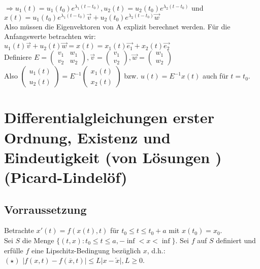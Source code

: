 \documentclass[12pt,a4paper]{article}
\newcommand{\DGLs}{Differentialgleichungen }
\newcommand{\LSG}{Lösungen }
\begin{document}
$\Rightarrow u_1(t) = u_1(t_0) e^{\lambda_1(t-t_0)}, u_2(t) = u_2(t_0) e^{\lambda_2(t-t_0)}$ und $x(t) = u_1(t_0) e^{\lambda_1(t-t_0)} \overset{\rightarrow}{v} + u_2(t_0)e^{\lambda_2(t-t_0)}\overset{\rightarrow}{w}$ \\
Also müssen die Eigenvektoren von A explizit berechnet werden. Für die Anfangswerte betrachten wir: \\
$u_1(t)\overset{\rightarrow}{v} + u_2(t)\overset{\rightarrow}{w} = x(t) = x_1(t) \overset{\rightarrow}{e_1} + x_2(t) \overset{\rightarrow}{e_2}$ \\
Definiere $E=\begin{pmatrix}
v_1 & w_1 \\
v_2 & w_2
\end{pmatrix}, \overset{\rightarrow}{v} = \begin{pmatrix}
v_1 \\
v_2
\end{pmatrix}, \overset{\rightarrow}{w} = \begin{pmatrix}
w_1 \\
w_2
\end{pmatrix}$ \\
Also $\begin{pmatrix}
u_1(t) \\
u_2(t)
\end{pmatrix} = E^{-1} \begin{pmatrix}
x_1(t) \\
x_2(t)
\end{pmatrix}$ bzw. $u(t) = E^{-1}x(t)$ auch für $t=t_0$.
\newpage
\section{\DGLs erster Ordnung, Existenz und Eindeutigkeit (von \LSG) (Picard-Lindelöf)}
\subsection{Vorraussetzung}
Betrachte $x'(t) = f(x(t),t)$ für $t_0 \leq t \leq t_0+a$ mit $x(t_0)=x_0$. \\
Sei $S$ die Menge $\{(t,x) : t_0 \leq t \leq a, -\inf < x < \inf\}$. Sei $f$ auf $S$ definiert und erfülle $f$ eine Lipschitz-Bedingung bezüglich $x$, d.h.: \\
$(\star)$ $|f(x,t)-f(\overline{x},t)|\leq L|x-\overleftarrow{x}|, L \geq 0$.
\end{document}
